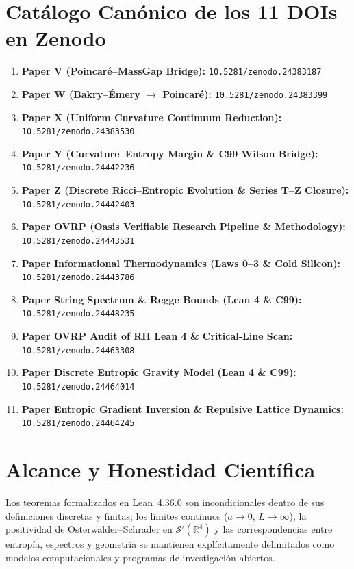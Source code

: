 \documentclass[11pt,a4paper]{article}
\begin{document}
\section{Cat\'alogo Can\'onico de los 11 DOIs en Zenodo}
\begin{enumerate}
    \item \textbf{Paper V (Poincar\'e--MassGap Bridge):} \texttt{10.5281/zenodo.24383187}
    \item \textbf{Paper W (Bakry--\'Emery $\to$ Poincar\'e):} \texttt{10.5281/zenodo.24383399}
    \item \textbf{Paper X (Uniform Curvature Continuum Reduction):} \texttt{10.5281/zenodo.24383530}
    \item \textbf{Paper Y (Curvature--Entropy Margin \& C99 Wilson Bridge):} \texttt{10.5281/zenodo.24442236}
    \item \textbf{Paper Z (Discrete Ricci--Entropic Evolution \& Series T--Z Closure):} \texttt{10.5281/zenodo.24442403}
    \item \textbf{Paper OVRP (Oasis Verifiable Research Pipeline \& Methodology):} \texttt{10.5281/zenodo.24443531}
    \item \textbf{Paper Informational Thermodynamics (Laws 0--3 \& Cold Silicon):} \texttt{10.5281/zenodo.24443786}
    \item \textbf{Paper String Spectrum \& Regge Bounds (Lean 4 \& C99):} \texttt{10.5281/zenodo.24448235}
    \item \textbf{Paper OVRP Audit of RH Lean 4 \& Critical-Line Scan:} \texttt{10.5281/zenodo.24463308}
    \item \textbf{Paper Discrete Entropic Gravity Model (Lean 4 \& C99):} \texttt{10.5281/zenodo.24464014}
    \item \textbf{Paper Entropic Gradient Inversion \& Repulsive Lattice Dynamics:} \texttt{10.5281/zenodo.24464245}
\end{enumerate}

\section{Alcance y Honestidad Cient\'ifica}
Los teoremas formalizados en Lean~4.36.0 son incondicionales dentro de sus definiciones discretas y finitas; los l\'imites continuos ($a \to 0$, $L \to \infty$), la positividad de Osterwalder--Schrader en $\mathcal{S}'(\mathbb{R}^4)$ y las correspondencias entre entrop\'ia, espectros y geometr\'ia se mantienen expl\'icitamente delimitados como modelos computacionales y programas de investigaci\'on abiertos.
\end{document}

